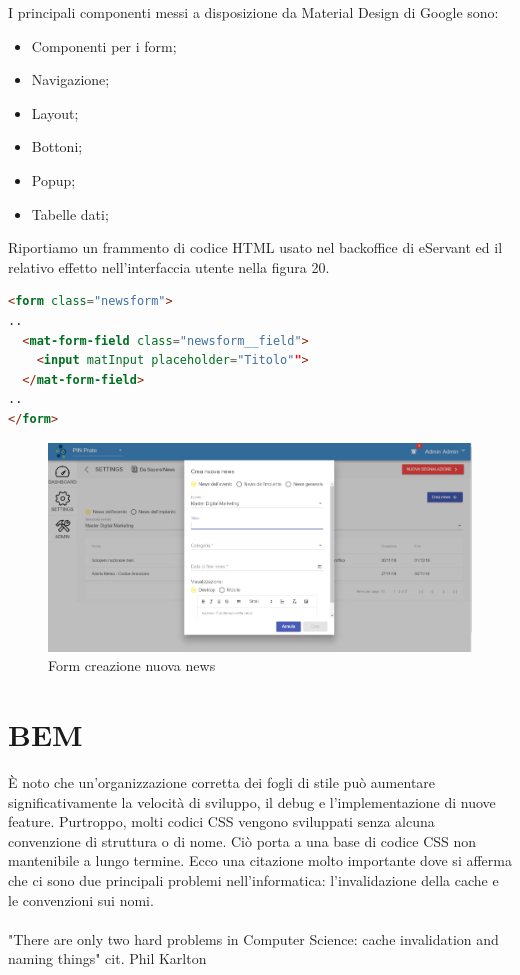 I principali componenti messi a disposizione da Material Design di Google sono:

\begin{itemize}
    \item Componenti per i form;
    \item Navigazione;
    \item Layout;
    \item Bottoni;
    \item Popup;
    \item Tabelle dati;
\end{itemize}

Riportiamo un frammento di codice HTML usato nel backoffice di eServant ed il relativo effetto
nell'interfaccia utente nella figura 20.

\begin{lstlisting}[language=html]
<form class="newsform">
..
  <mat-form-field class="newsform__field">
    <input matInput placeholder="Titolo"">
  </mat-form-field>
..
</form>
\end{lstlisting}

\begin{figure}[H]
    \centering  
    \caption{Form creazione nuova news}
    \includegraphics[scale=0.4]{img/cap3/backoffice-form}
\end{figure}

\section{BEM}
È noto che un'organizzazione corretta dei fogli di stile può aumentare significativamente la velocità
di sviluppo, il debug e l'implementazione di nuove feature. Purtroppo, molti codici CSS vengono
sviluppati senza alcuna convenzione di struttura o di nome. Ciò porta a una base di codice CSS 
non mantenibile a lungo termine.
Ecco una citazione molto importante dove si afferma che ci sono due principali problemi nell'informatica: l'invalidazione della cache e le convenzioni sui nomi.\\\\
"There are only two hard problems in Computer Science: cache invalidation and naming things" cit. Phil Karlton\\

